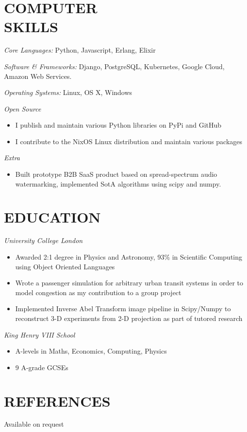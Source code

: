 \documentclass[margin, 10pt]{res}
\begin{document}
\begin{resume}

\section{COMPUTER \\ SKILLS}

{\sl Core Languages:}
Python, Javascript, Erlang, Elixir

{\sl Software \& Frameworks:}
Django, PostgreSQL, Kubernetes, Google Cloud, Amazon Web Services.

{\sl Operating Systems:} Linux, OS X, Windows

{\sl Open Source}
\begin{itemize}
\item I publish and maintain various Python libraries on PyPi and GitHub
\item I contribute to the NixOS Linux distribution and maintain various packages
\end{itemize}

{\sl Extra}
\begin{itemize}
\item Built prototype B2B SaaS product based on spread-spectrum audio watermarking, implemented SotA algorithms using scipy and numpy.
\end{itemize}


\section{EDUCATION}

{\sl University College London} \\
\begin{itemize} \itemsep -1pt
\item Awarded 2:1 degree in Physics and Astronomy, 93\% in Scientific Computing using Object Oriented Languages
\item Wrote a passenger simulation for arbitrary urban transit systems in order to model congestion as my contribution to a group project
\item Implemented Inverse Abel Transform image pipeline in Scipy/Numpy to reconstruct 3-D experiments from 2-D projection as part of tutored research
\end{itemize}

{\sl King Henry VIII School} \\
\begin{itemize}
\item A-levels in Maths, Economics, Computing, Physics
\item 9 A-grade GCSEs
\end{itemize}

\section{REFERENCES}
Available on request

\end{resume}
\end{document}
